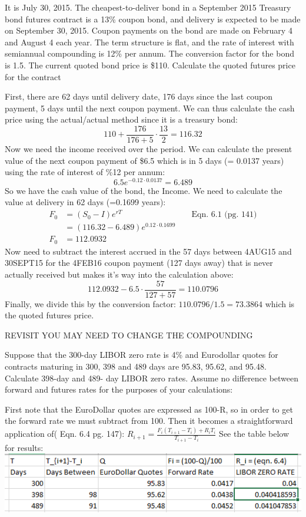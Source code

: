 \documentclass[12pt]{article}
\newenvironment{problem}[3][Problem]{\begin{trivlist}
\item[\hskip \labelsep {\bfseries #1}\hskip \labelsep {\bfseries #2.}]}{\end{trivlist}}
\begin{document}
\begin{problem}{6.11}. It is July 30, 2015. The cheapest-to-deliver bond in a September 2015 Treasury bond futures
contract is a 13\% coupon bond, and delivery is expected to be made on September 30, 2015.
Coupon payments on the bond are made on February 4 and August 4 each year. The term
structure is flat, and the rate of interest with semiannual compounding is 12\% per annum.
The conversion factor for the bond is 1.5. The current quoted bond price is \$110. Calculate
the quoted futures price for the contract

First, there are 62 days until delivery date, 176 days since the last coupon payment, 5 days until the next coupon payment. 
We can thus calculate the cash price using the actual/actual method since it is a treasury bond: 
$$ 110 + \frac{176}{176+5} \cdot \frac{13}{2}  = 116.32$$
Now we need the income received over the period. We can calculate the present value of the next coupon payment of \$6.5 which is in 5 days (= 0.0137 years) using the rate of interest of \%12 per annum: 
$$ 6.5e^{-0.12\cdot 0.0137} = 6.489 $$
So we have the cash value of the bond, the Income. We need to calculate the value at delivery in 62 days (=0.1699 years):
\begin{align*}
F_0 &= (S_0 - I)e^{rT}  && \text{ Eqn. 6.1 (pg. 141)} \\
&= (116.32 - 6.489)e^{0.12\cdot 0.1699} \\
F_0 &= 112.0932
\end{align*}
Now need to subtract the interest accrued in the 57 days between 4AUG15 and 30SEPT15 for the 4FEB16 coupon payment (127 days away) that is never actually received  but makes it\rq{}s way into the calculation above: 
$$ 112.0932 - 6.5 \cdot \frac{57}{127+57} = 110.0796 $$
Finally, we divide this by the conversion factor: $110.0796/1.5 = 73.3864$ which is the quoted futures price.
\end{problem}

\newpage
\begin{problem}{6.14}. REVISIT YOU MAY NEED TO CHANGE THE COMPOUNDING %

Suppose that the 300-day LIBOR zero rate is 4\% and Eurodollar quotes for contracts
maturing in 300, 398 and 489 days are 95.83, 95.62, and 95.48. Calculate 398-day and 489-
day LIBOR zero rates. Assume no difference between forward and futures rates for the
purposes of your calculations:

First note that the EuroDollar quotes are expressed as 100-R, so in order to get the forward rate we must subtract from 100. Then it becomes a straightforward application of( Eqn. 6.4 pg. 147): $R_{i+1} = \frac{F_i(T_{i+1}-T_i) + R_iT_i}{T_{i+1}-T_i} $ See the table below for results:\\
\includegraphics[width=\textwidth]{mod5_p614.png}
\end{problem}
\end{document}
